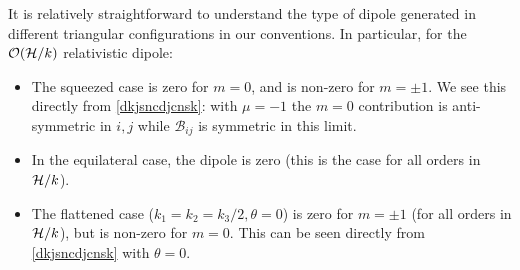 It is relatively straightforward to understand the type of dipole generated in different triangular configurations in our conventions. In particular, for the $\mathcal{O}(\mathcal{H}/k)$ relativistic dipole:
\begin{itemize}
\item The squeezed case is zero for $m=0$, and is non-zero for $m=\pm1$. We see this directly from \eqref{dkjsncdjcnsk}: with $\mu=-1$ the $m=0$ contribution is anti-symmetric in $i,j$ while $\mathcal{B}_{ij}$ is symmetric in this limit.
\item In the equilateral case, the dipole is zero (this is the case for all orders in $\mathcal{H}/k$).
\item The flattened case ($k_1=k_2=k_3/2,\theta=0$) is zero for $m=\pm1$ (for all orders in $\mathcal{H}/k$), but is non-zero for $m=0$. This can be seen directly from \eqref{dkjsncdjcnsk} with $\theta=0$.
\end{itemize}
 
